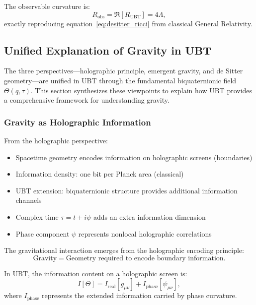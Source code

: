 The observable curvature is:
\begin{equation}
R_{\text{obs}} = \Re[R_{\text{UBT}}] = 4\Lambda,
\end{equation}
exactly reproducing equation~\eqref{eq:desitter_ricci} from classical General Relativity.

\subsection{Unified Explanation of Gravity in UBT}

The three perspectives—holographic principle, emergent gravity, and de Sitter geometry—are unified in UBT through the fundamental biquaternionic field $\Theta(q,\tau)$. This section synthesizes these viewpoints to explain how UBT provides a comprehensive framework for understanding gravity.

\subsubsection{Gravity as Holographic Information}

From the holographic perspective:
\begin{itemize}
\item Spacetime geometry encodes information on holographic screens (boundaries)
\item Information density: one bit per Planck area (classical)
\item UBT extension: biquaternionic structure provides additional information channels
\item Complex time $\tau = t + i\psi$ adds an extra information dimension
\item Phase component $\psi$ represents nonlocal holographic correlations
\end{itemize}

The gravitational interaction emerges from the holographic encoding principle:
\begin{equation}
\text{Gravity} = \text{Geometry required to encode boundary information}.
\end{equation}

In UBT, the information content on a holographic screen is:
\begin{equation}
I[\Theta] = I_{\text{real}}[g_{\mu\nu}] + I_{\text{phase}}[\psi_{\mu\nu}],
\end{equation}
where $I_{\text{phase}}$ represents the extended information carried by phase curvature.

